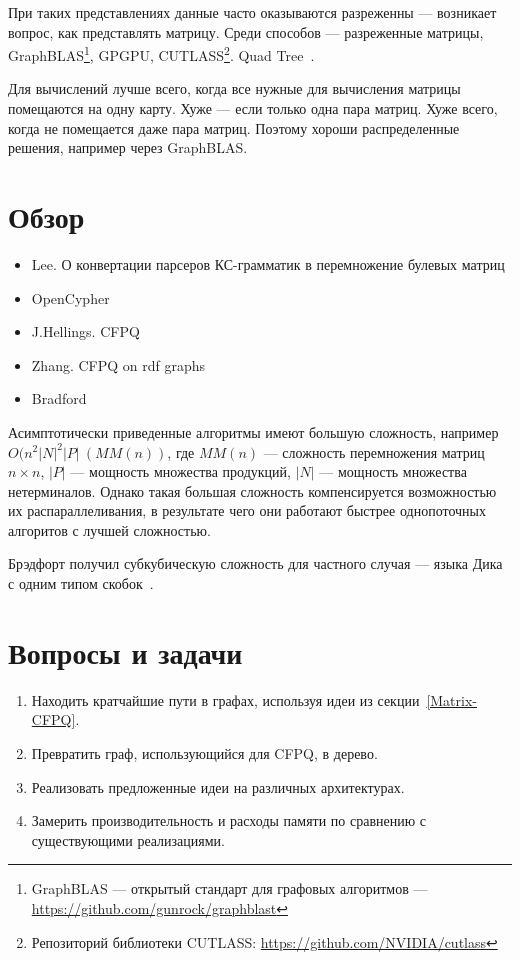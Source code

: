 При таких представлениях данные часто оказываются разреженны --- возникает вопрос, как представлять матрицу. Среди способов --- разреженные матрицы, GraphBLAS\footnote{GraphBLAS --- открытый стандарт для графовых алгоритмов --- \url{https://github.com/gunrock/graphblast} }, GPGPU, CUTLASS\footnote{Репозиторий библиотеки CUTLASS: \url{https://github.com/NVIDIA/cutlass}}.
Quad Tree~\cite{quadtree}.

Для вычислений лучше всего, когда все нужные для вычисления матрицы помещаются на одну карту. Хуже --- если только одна пара матриц. Хуже всего, когда не помещается даже пара матриц. Поэтому хороши распределенные решения, например через GraphBLAS.

\section{Обзор}
\begin{itemize}
    \item Lee. О конвертации парсеров КС-грамматик в перемножение булевых матриц~\cite{Lee:2002:FCG:505241.505242}
    \item OpenCypher~\cite{Kuijpers:2019:ESC:3335783.3335791}
    \item J.Hellings. CFPQ~\cite{hellingsRelational,hellings2015querying,Hellings2015PathRF}
    \item Zhang. CFPQ on rdf graphs~\cite{10.1007/978-3-319-46523-4_38}
    \item Bradford~\cite{bradford2007quickest,ward2008distributed,bradford2016fast,Bradford:2008:LCG:1373936.1373946}
\end{itemize}

Асимптотически приведенные алгоритмы имеют большую сложность, например \\ $O(n^2 |N|^2|P|~ (MM(n))$, где $MM(n)$ --- сложность перемножения матриц $n \times n$, $|P|$ --- мощность множества продукций, $|N|$ --- мощность множества нетерминалов. Однако такая большая сложность компенсируется возможностью их распараллеливания, в результате чего они работают быстрее однопоточных алгоритов с лучшей сложностью.

Брэдфорт получил субкубическую сложность для частного случая --- языка Дика с одним типом скобок~\cite{8249039}.

\section{Вопросы и задачи}
\begin{enumerate}
    \item Находить кратчайшие пути в графах, используя идеи из секции~\ref{Matrix-CFPQ}.
    \item Превратить граф, использующийся для CFPQ, в дерево.
    \item Реализовать предложенные идеи на различных архитектурах.
    \item Замерить производительность и расходы памяти по сравнению с существующими реализациями.
\end{enumerate}
